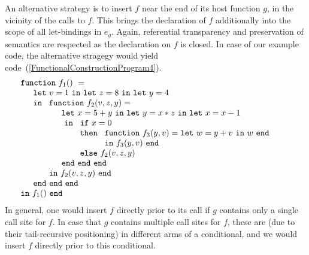 An alternative strategy is to insert $f$ near the end of its host
function $g$, in the vicinity of the calls to $f$. This brings the
declaration of $f$ additionally into the scope of all let-bindings in
$e_g$. Again, referential transparency and preservation of semantics
are respected as the declaration on $f$ is closed. In case of our
example code, the alternative stragegy would yield
code~(\ref{FunctionalConstructionProgram4}).
\begin{equation}
\label{FunctionalConstructionProgram4}
\begin{array}{l}
\mathtt{function}\ f_1()\ = \\
  \quad
  \begin{array}{l}
     \mathtt{let}\ v = 1 \ 
     \mathtt{in\ let}\ z = 8 \ 
     \mathtt{in\ let}\ y = 4\\
     \mathtt{in}\ 
     \begin{array}[t]{l}
       \mathtt{function}\ f_2(v,z,y) =\\
         \quad
         \begin{array}{l}
           \mathtt{let}\ x = 5+y\
           \mathtt{in\ let}\ y = x*z\
           \mathtt{in\ let}\ x = x-1\\\
           \mathtt{in}\
           \begin{array}[t]{l}
             \mathtt{if}\ x=0\\ 
             \mathtt{then}\ 
               \begin{array}[t]{l}
                 \mathtt{function}\ f_3(y,v) = 
                 \mathtt{let}\ w = y+v\ \mathtt{in}\ w\ \mathtt{end}\\
                 \mathtt{in}\ f_3(y,v)\ \mathtt{end}
               \end{array}\\
             \mathtt{else}\ f_2(v,z,y)
           \end{array}\\
           \mathtt{end\ end\ end}
         \end{array}\\
     \mathtt{in}\ f_2(v,z,y)\ \mathtt{end}
     \end{array}\\
     \mathtt{end\ end\ end}\\
   \end{array}\\
\mathtt{in}\ f_1()\  \mathtt{end}
\end{array}
\end{equation}
In general, one would insert $f$ directly prior to its call if $g$
contains only a single call site for $f$. In case that $g$ contains
multiple call sites for $f$, these are (due to their tail-recursive
positioning) in different arms of a conditional, and we would insert
$f$ directly prior to this conditional. 

